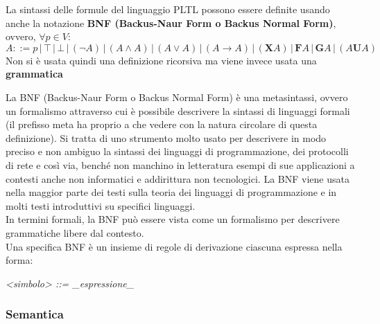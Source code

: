 \documentclass[a4paper,12pt, oneside]{book}
\begin{document}
\begin{definizione}
  La sintassi delle formule del linguaggio PLTL possono essere definite usando
  anche la notazione \textbf{BNF (Backus-Naur Form o Backus Normal Form)},
  ovvero, $\forall p\in V$:
  \[A::=p\,|\,\top\,|\,\bot\,|\,(\neg A)\,|\,(A\land A)\,|\,(A\lor A)\,|\,(A\to
    A)\,|\,(\mathbf{X}A)\,|\,\mathbf{F}A\,|\,\mathbf{G}A\,|\,(A\mathbf{U}A)\]
  Non si è usata quindi una definizione ricorsiva ma viene invece usata una
  \textbf{grammatica}\\
  \begin{shaded}
    La BNF (Backus-Naur Form o Backus Normal Form) è una metasintassi, ovvero un
    formalismo attraverso cui è possibile descrivere la sintassi di linguaggi
    formali (il prefisso meta ha proprio a che vedere con la natura circolare di
    questa definizione). Si tratta di uno strumento molto usato per descrivere
    in modo preciso e non ambiguo la sintassi dei linguaggi di programmazione,
    dei protocolli di rete e così via, benché non manchino in letteratura esempi
    di sue applicazioni a contesti anche non informatici e addirittura non
    tecnologici. La BNF viene usata nella maggior parte dei testi sulla teoria
    dei linguaggi di programmazione e in molti testi introduttivi su specifici
    linguaggi. \\
    In termini formali, la BNF può essere vista come un formalismo per descrivere
    grammatiche libere dal contesto.  \\
    Una specifica BNF è un insieme di regole di derivazione ciascuna espressa nella forma:
    \begin{center}

      \textit{<simbolo> ::= \_espressione\_}
      
    \end{center}
  \end{shaded}
\end{definizione}
\newpage
\subsubsection{Semantica}
\end{document}

